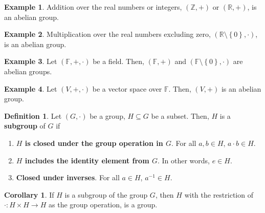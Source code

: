 \documentclass[letterpaper,12pt]{article}
\theoremstyle{definition}
\newtheorem*{definition}{Definition}
\newtheorem*{example}{Example}
\newtheorem*{corollary}{Corollary}
\newcommand{\set}[1]{\left\{ #1 \right\}}
\begin{document}
\begin{example}
Addition over the real numbers or integers, $(\mathbb{Z}, +)$ or $(\mathbb{R}, +)$, is an abelian group.
\end{example}

\begin{example}
Multiplication over the real numbers excluding zero, $(\mathbb{R} \setminus \set{0}, \cdot)$, is an abelian group.
\end{example}

\begin{example}
Let $(\mathbb{F}, +, \cdot)$ be a field. Then, $(\mathbb{F}, +)$ and $(\mathbb{F} \setminus \set{0}, \cdot)$ are abelian groups.
\end{example}

\begin{example}
Let $(V, +, \cdot)$ be a vector space over $\mathbb{F}$. Then, $(V, +)$ is an abelian group.
\end{example}

\begin{definition}
Let $(G, \cdot)$ be a group, $H \subseteq G$ be a subset. Then, $H$ is a \textbf{subgroup} of $G$ if
\begin{enumerate}
    \item \textbf{$H$ is closed under the group operation in $G$}. For all $a, b \in H$, $a \cdot b \in H$.
    \item \textbf{$H$ includes the identity element from $G$}. In other words, $e \in H$.
    \item \textbf{Closed under inverses}. For all $a \in H$, $a^{-1} \in H$.
\end{enumerate}
\end{definition}

\begin{corollary}
If $H$ is a subgroup of the group $G$, then $H$ with the restriction of $\cdot: H \times H \rightarrow H$  as the group operation, is a group.
\end{corollary}
\end{document}
